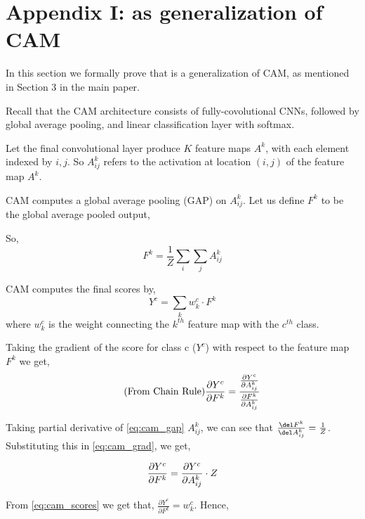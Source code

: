 \section*{Appendix I: \gcam{} as generalization of CAM}\label{sec:sup_generalization}

In this section we formally prove that \gcam{} is a generalization of CAM, as mentioned in Section 3 in the main paper.

Recall that the CAM architecture consists of fully-covolutional CNNs, followed by global average pooling, and linear classification layer with softmax.

Let the final convolutional layer produce $K$ feature maps $A^k$, with each element indexed by $i,j$. 
So $A_{ij}^k$ refers to the activation at location $(i,j)$ of the feature map $A^k$.

CAM computes a global average pooling (GAP) on $A_{ij}^k$. Let us define $F^k$ to be the global average pooled output,

So,
\begin{equation}\label{eq:cam_gap} 
    F^{k} = \frac{1}{Z} \sum_{i} \sum_{j} A_{ij}^k
\end{equation}

CAM computes the final scores by,
\begin{equation}\label{eq:cam_scores}
    Y^c = \sum_{k} w_{k}^c \cdot F^{k}
\end{equation}
where $w_{k}^c$ is the weight connecting the $k^{th}$ feature map with the $c^{th}$ class. 

Taking the gradient of the score for class c ($Y^c$)  with respect to the feature map $F^k$ we get,
\begin{equation}\label{eq:cam_grad}
    \qquad \text{(From Chain Rule)}\\
    \frac{\partial Y^c}{\partial F^k} = \frac{\frac{\partial Y^c}{\partial A_{ij}^k}}{\frac{\partial F^k}{\partial A_{ij}^k}}
\end{equation}

Taking partial derivative of  \eqref{eq:cam_gap} \wrt $A_{ij}^k$, we can see that $\frac{\del F^k}{\del A^k_{ij}} = \frac{1}{Z}$. Substituting this in \eqref{eq:cam_grad}, we get,

\begin{equation}
    \frac{\partial Y^c}{\partial F^k} = \frac{\partial Y^c}{\partial A_{ij}^k} \cdot Z\\
\end{equation}

From \eqref{eq:cam_scores} we get that, $ \frac{\partial Y^c}{\partial F^k} = w_{k}^c$. Hence,

